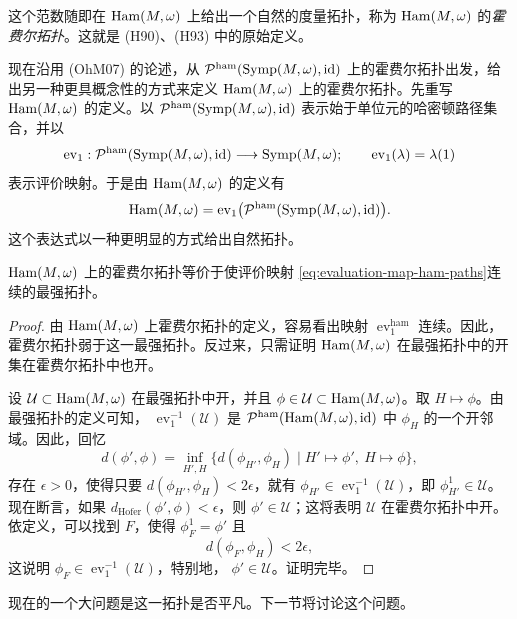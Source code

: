 这个范数随即在 $\operatorname{Ham}(M,\omega)$ 上给出一个自然的度量拓扑，称为
$\operatorname{Ham}(M,\omega)$ 的\emph{霍费尔拓扑}。这就是 (H90)、(H93) 中的原始定义。

现在沿用 (OhM07) 的论述，从
$\mathcal P^{\mathrm{ham}}(\operatorname{Symp}(M,\omega),\operatorname{id})$ 上的霍费尔拓扑出发，给出另一种更具概念性的方式来定义 $\operatorname{Ham}(M,\omega)$ 上的霍费尔拓扑。先重写 $\operatorname{Ham}(M,\omega)$ 的定义。以
$\mathcal P^{\mathrm{ham}}(\operatorname{Symp}(M,\omega),\operatorname{id})$ 表示始于单位元的哈密顿路径集合，并以
\begin{equation}
 \operatorname{ev}_1:
 \mathcal P^{\mathrm{ham}}(\operatorname{Symp}(M,\omega),\operatorname{id})
 \longrightarrow\operatorname{Symp}(M,\omega);
 \qquad \operatorname{ev}_1(\lambda)=\lambda(1)
 \label{eq:evaluation-map-ham-paths}
\end{equation}
表示评价映射。于是由 $\operatorname{Ham}(M,\omega)$ 的定义有
\begin{equation}
 \operatorname{Ham}(M,\omega)=\operatorname{ev}_1\bigl(
 \mathcal P^{\mathrm{ham}}(\operatorname{Symp}(M,\omega),\operatorname{id})\bigr).
 \label{eq:ham-as-evaluation-image}
\end{equation}
这个表达式以一种更明显的方式给出自然拓扑。

\begin{proposition}\label{prop:hofer-topology-quotient}
$\operatorname{Ham}(M,\omega)$ 上的霍费尔拓扑等价于使评价映射
\eqref{eq:evaluation-map-ham-paths}连续的最强拓扑。
\end{proposition}

\begin{proof}
由 $\operatorname{Ham}(M,\omega)$ 上霍费尔拓扑的定义，容易看出映射
$\operatorname{ev}_1^{\mathrm{ham}}$ 连续。因此，霍费尔拓扑弱于这一最强拓扑。反过来，只需证明 $\operatorname{Ham}(M,\omega)$ 在最强拓扑中的开集在霍费尔拓扑中也开。

设 $\mathcal U\subset\operatorname{Ham}(M,\omega)$ 在最强拓扑中开，并且
$\phi\in\mathcal U\subset\operatorname{Ham}(M,\omega)$。取 $H\mapsto\phi$。由最强拓扑的定义可知，
$\operatorname{ev}_1^{-1}(\mathcal U)$ 是
$\mathcal P^{\mathrm{ham}}(\operatorname{Ham}(M,\omega),\operatorname{id})$ 中
$\phi_H$ 的一个开邻域。因此，回忆
\[
 d(\phi',\phi)
 =\inf_{H',H}\{d(\phi_{H'},\phi_H)\mid
   H'\mapsto\phi',\ H\mapsto\phi\},
\]
存在 $\epsilon>0$，使得只要
$d(\phi_{H'},\phi_H)<2\epsilon$，就有
$\phi_{H'}\in\operatorname{ev}_1^{-1}(\mathcal U)$，即
$\phi_{H'}^1\in\mathcal U$。现在断言，如果
$d_{\mathrm{Hofer}}(\phi',\phi)<\epsilon$，则 $\phi'\in\mathcal U$；这将表明 $\mathcal U$ 在霍费尔拓扑中开。依定义，可以找到 $F$，使得
$\phi_F^1=\phi'$ 且
\[
 d(\phi_F,\phi_H)<2\epsilon,
\]
这说明 $\phi_F\in\operatorname{ev}_1^{-1}(\mathcal U)$，特别地，
$\phi'\in\mathcal U$。证明完毕。
\end{proof}

现在的一个大问题是这一拓扑是否平凡。下一节将讨论这个问题。
